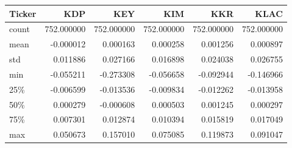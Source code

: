 \begin{tabular}{lrrrrr}
\toprule
Ticker & KDP & KEY & KIM & KKR & KLAC \\
\midrule
count & 752.000000 & 752.000000 & 752.000000 & 752.000000 & 752.000000 \\
mean & -0.000012 & 0.000163 & 0.000258 & 0.001256 & 0.000897 \\
std & 0.011886 & 0.027166 & 0.016898 & 0.024038 & 0.026755 \\
min & -0.055211 & -0.273308 & -0.056658 & -0.092944 & -0.146966 \\
25\% & -0.006599 & -0.013536 & -0.009834 & -0.012262 & -0.013958 \\
50\% & 0.000279 & -0.000608 & 0.000503 & 0.001245 & 0.000297 \\
75\% & 0.007301 & 0.012874 & 0.010394 & 0.015819 & 0.017049 \\
max & 0.050673 & 0.157010 & 0.075085 & 0.119873 & 0.091047 \\
\bottomrule
\end{tabular}
